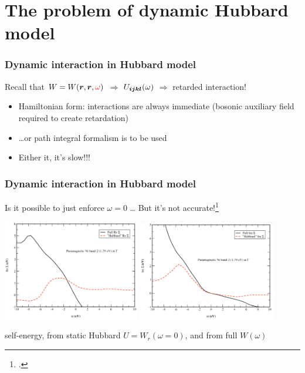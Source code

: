 \documentclass{beamer}
\begin{document}
\section{The problem of dynamic Hubbard model}

\begin{frame}
\frametitle{Dynamic interaction in Hubbard model}

Recall that $W = W(\vb*{r}, \vb*{r}, \textcolor{red}{\omega} )$
$\Rightarrow$ 
$U_{\vb*{i} \vb*{j} \vb*{k} \vb*{l}}(\omega)$
$\Rightarrow$
retarded interaction! 

\begin{itemize}
    \item Hamiltonian form: interactions are always immediate 
    (bosonic auxiliary field required to create retardation)
    \item \dots or path integral formalism is to be used 
    \item Either it, it's slow!!! 
\end{itemize}

\end{frame}

\begin{frame}
\frametitle{Dynamic interaction in Hubbard model}

Is it possible to just enforce $\omega = 0$ \dots
But it's not accurate!\footcite{aryasetiawan2004frequency}

\begin{center}
    \includegraphics[width=0.45\textwidth]{plots/ni-re-sigma-1.PNG}
    \includegraphics[width=0.45\textwidth]{plots/ni-im-sigma-1.PNG}
\end{center}

 self-energy, from static Hubbard $U = W_r(\omega = 0)$,
and from full $W(\omega)$ 

\end{frame}
\end{document}
